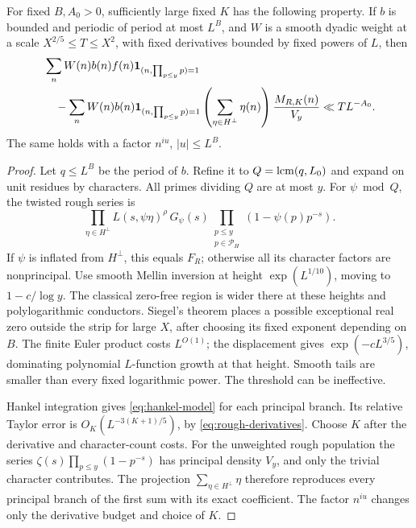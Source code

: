 \begin{lemma}\label{lem:rough-means}
For fixed \(B,A_0>0\), sufficiently large fixed \(K\) has the
following property. If \(b\) is bounded and periodic of period at
most \(L^B\), and \(W\) is a smooth dyadic weight at a scale
\(X^{2/5}\le T\le X^2\), with fixed derivatives bounded by
fixed powers of \(L\),
then
\begin{align*}
 &\sum_n W(n)b(n)f(n)\mathbf 1_{(n,\prod_{p\le y}p)=1}\\
 &\quad-\sum_n W(n)b(n)\mathbf 1_{(n,\prod_{p\le y}p)=1}
       \left(\sum_{\eta\in H^\perp}\eta(n)\right)
                  \frac{M_{R,K}(n)}{V_y}\ll T L^{-A_0}.
\end{align*}
The same holds with a factor \(n^{iu}\), \(|u|\le L^B\).
\end{lemma}
\begin{proof}
Let \(q\le L^B\) be the period of \(b\). Refine it to \(Q=\operatorname{lcm}(q,L_0)\) and expand on unit residues
by characters. All primes dividing \(Q\) are at most \(y\).
For \(\psi\bmod Q\), the twisted rough series is
\[
 \prod_{\eta\in H^\perp}L(s,\psi\eta)^\rho\,G_\psi(s)
 \prod_{\substack{p\le y\\p\in\mathcal P_H}}(1-\psi(p)p^{-s}).
\]
If \(\psi\) is inflated from \(H^\perp\), this equals \(F_R\);
otherwise all its character factors are nonprincipal.
Use smooth Mellin inversion at height \(\exp(L^{1/10})\), moving
to \(1-c/\log y\). The classical zero-free region is wider there
at these heights and polylogarithmic conductors. Siegel's theorem
places a possible exceptional real zero outside the strip for large
\(X\), after choosing its fixed exponent depending on \(B\).
The finite Euler product costs \(L^{O(1)}\); the displacement gives
\(\exp(-cL^{3/5})\), dominating polynomial \(L\)-function growth at
that height. Smooth tails are smaller than every fixed logarithmic
power. The threshold can be ineffective.

Hankel integration gives \eqref{eq:hankel-model} for each principal
branch. Its relative Taylor error is \(O_K(L^{-3(K+1)/5})\),
by \eqref{eq:rough-derivatives}.
Choose \(K\) after the derivative and character-count costs.
For the unweighted rough population the series
\(\zeta(s)\prod_{p\le y}(1-p^{-s})\) has principal density \(V_y\),
and only the trivial character contributes. The projection
\(\sum_{\eta\in H^\perp}\eta\) therefore reproduces every principal
branch of the first sum with its exact coefficient. The factor
\(n^{iu}\) changes only the derivative budget and choice of \(K\).
\end{proof}

